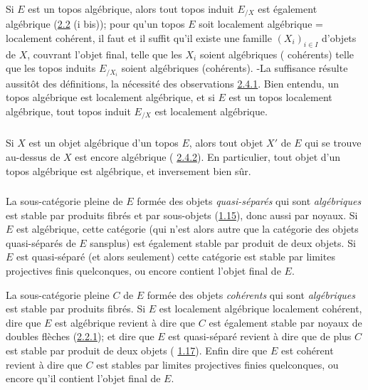 \subsubsection{}
Si $E$ est un topos algébrique, alors tout topos induit $E_{/X}$ est
également algébrique (\hyperref[VI.prop2.2]{2.2} (i bis)); pour qu'un topos $E$ soit
localement algébrique = localement cohérent, il faut et il suffit
qu'il existe une famille $(X_i)_{i \in I}$ d'objets de $X$, couvrant
l'objet final, telle que les $X_i$ soient algébriques (\resp
cohérents) \ie telle que les topos induits $E_{/X_{i}}$ soient algébriques
(\resp cohérents). -La suffisance résulte aussitôt des définitions, la
nécessité des observations \hyperref[VI.subsubsec2.4.1]{2.4.1}. Bien entendu, un topos algébrique
est localement algébrique, et si $E$ est un topos localement
algébrique, tout topos induit $E_{/X}$ est localement algébrique.

\subsubsection{}
Si $X$ est un objet algébrique d'un topos $E$, alors tout objet $X'$
de $E$ qui se trouve au-dessus de $X$ est encore algébrique (\cf
\hyperref[VI.subsubsec2.4.2]{2.4.2}). En particulier, tout objet d'un topos algébrique est
algébrique, et inversement bien sûr.

\subsubsection{}
La sous-catégorie pleine de $E$ formée des objets
\emph{quasi-séparés} qui sont \emph{algébriques} est stable par
produits fibrés et par sous-objets (\hyperref[VI.cor1.15]{1.15}), donc aussi
par noyaux. Si $E$ est algébrique, cette catégorie (qui n'est alors
autre que la catégorie des objets quasi-séparés de $E$
sans\pageoriginale plus) est également stable par produit de deux
objets. Si $E$ est quasi-séparé (et alors seulement) cette catégorie
est stable par limites projectives finis quelconques, ou encore
contient l'objet final de $E$.

La sous-catégorie pleine $C$ de $E$ formée des objets \emph{cohérents}
qui sont \emph{algébriques} est stable par produits fibrés. Si $E$ est
localement algébrique \ie localement cohérent, dire que $E$ est
algébrique revient à dire que $C$ est également stable par noyaux de
doubles flèches (\hyperref[VI.rem2.2.1]{2.2.1}); et dire que $E$ est quasi-séparé revient à
dire que de plus $C$ est stable par produit de deux objets (\cf
\hyperref[VI.cor1.17]{1.17}). Enfin dire que $E$ est cohérent revient à dire que $C$ est
stables par limites projectives finies quelconques, ou encore qu'il
contient l'objet final de $E$.

